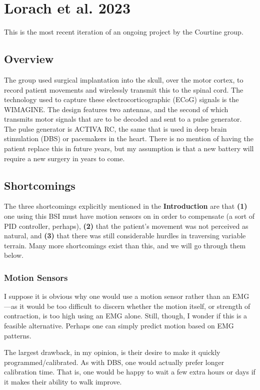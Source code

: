 \documentclass[12pt]{report}
\begin{document}
\section{Lorach et al. 2023} This is the most recent iteration of an ongoing project by the Courtine group. 

\subsection{Overview} The group used surgical implantation into the skull, over the motor cortex, to record patient movements and wirelessly transmit this to the spinal cord. The technology used to capture these electrocorticographic (ECoG) signals is the WIMAGINE. The design features two antennas, and the second of which transmits motor signals that are to be decoded and sent to a pulse generator. The pulse generator is ACTIVA RC, the same that is used in deep brain stimulation (DBS) or pacemakers in the heart. There is no mention of having the patient replace this in future years, but my assumption is that a new battery will require a new surgery in years to come. 


\subsection{Shortcomings} The three shortcomings explicitly mentioned in the \textbf{Introduction} are that \textbf{(1)} one using this BSI must have motion sensors on in order to compensate (a sort of PID controller, perhaps),  \textbf{(2)} that the patient's movement was not perceived as natural, and \textbf{(3)} that there was still considerable hurdles in traversing variable terrain. Many more shortcomings exist than this, and we will go through them below.\newline

\subsubsection{Motion Sensors} I suppose it is obvious why one would use a motion sensor rather than an EMG---as it would be too difficult to discern whether the motion itself, or strength of contraction, is too high using an EMG alone. Still, though, I wonder if this is a feasible alternative. Perhaps one can simply predict motion based on EMG patterns.\newline

The largest drawback, in my opinion, is their desire to make it quickly programmed/calibrated. As with DBS, one would actually prefer longer calibration time. That is, one would be happy to wait a few extra hours or days if it makes their ability to walk improve.\newline
\end{document}
